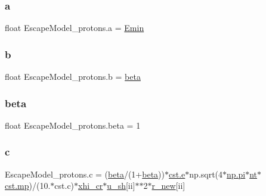 \subsubsection{\texorpdfstring{a}{a}}
{\footnotesize\ttfamily float Escape\+Model\+\_\+protons.\+a = \hyperlink{namespaceEscapeModel__protons_a7107c24679a9b21c930d08b32743b5cf}{Emin}}

\mbox{\label{namespaceEscapeModel__protons_aba05547d0061c1800fcc308533f20660}} 
\subsubsection{\texorpdfstring{b}{b}}
{\footnotesize\ttfamily float Escape\+Model\+\_\+protons.\+b = \hyperlink{namespaceEscapeModel__protons_aed6ba9747962e8235f612edf7305ae9f}{beta}}

\mbox{\label{namespaceEscapeModel__protons_aed6ba9747962e8235f612edf7305ae9f}} 
\subsubsection{\texorpdfstring{beta}{beta}}
{\footnotesize\ttfamily float Escape\+Model\+\_\+protons.\+beta = 1}

\mbox{\label{namespaceEscapeModel__protons_a85e73fe6c388df6b0cd0dd3f971ddbb4}} 
\subsubsection{\texorpdfstring{c}{c}}
{\footnotesize\ttfamily Escape\+Model\+\_\+protons.\+c = (\hyperlink{namespaceEscapeModel__protons_aed6ba9747962e8235f612edf7305ae9f}{beta}/(1+\hyperlink{namespaceEscapeModel__protons_aed6ba9747962e8235f612edf7305ae9f}{beta}))$\ast$\hyperlink{constants_8h_a2b076531cd50c7b55702a53221f2ac72}{cst.\+e}$\ast$np.\+sqrt(4$\ast$\hyperlink{constants_8h_a43016d873124d39034edb8cd164794db}{np.\+pi}$\ast$\hyperlink{namespaceEscapeModel__protons_aea8f96db5e10e84cf033c2f0000e9642}{nt}$\ast$\hyperlink{constants_8h_a6b331c08a80ed71d31c55a3341776483}{cst.\+mp})/(10.$\ast$cst.\+c)$\ast$\hyperlink{namespaceEscapeModel__protons_a0448c3c4f8095c021886f1311a7dd513}{xhi\+\_\+cr}$\ast$\hyperlink{namespaceEscapeModel__protons_abf6e90959e3d1660385fdde463f9803e}{u\+\_\+sh}\mbox{[}ii\mbox{]}$\ast$$\ast$2$\ast$\hyperlink{namespaceEscapeModel__protons_a7c31400eb18c12fd0b7a7acafda225d0}{r\+\_\+new}\mbox{[}ii\mbox{]}}

